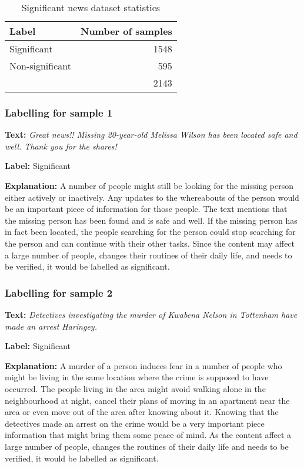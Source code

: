 \begin{table}[h]
\begin{center}
\caption{Significant news dataset statistics}
\label{tbl:dataset_statistics}
\begin{tabular}{lr}
\toprule 
Label&Number of samples\\
\midrule 
Significant&1548\\
Non-significant&595\\
\bottomrule
&2143 \\
\end{tabular}
\end{center}
\end{table}

\subsubsection{Labelling for sample 1}
\textbf{Text:}
\textit{Great news!! Missing 20-year-old Melissa Wilson has been located safe and well. Thank you for the shares!}\par
\textbf{Label:} Significant\par
\textbf{Explanation:} A number of people might still be looking for the missing person either actively or inactively. Any updates to the whereabouts of the person would be an important piece of information for those people. The text mentions that the missing person has been found and is safe and well. If the missing person has in fact been located, the people searching for the person could stop searching for the person and can continue with their other tasks. Since the content may affect a large number of people, changes their routines of their daily life, and needs to be verified, it would be labelled as significant.

\subsubsection{Labelling for sample 2}
\textbf{Text:}
\textit{Detectives investigating the murder of Kwabena Nelson in Tottenham have made an arrest Haringey.}\par
\textbf{Label:} Significant\par
\textbf{Explanation:} A murder of a person induces fear in a number of people who might be living in the same location where the crime is supposed to have occurred. The people living in the area might avoid walking alone in the neighbourhood at night, cancel their plans of moving in an apartment near the area or even move out of the area after knowing about it. Knowing that the detectives made an arrest on the crime would be a very important piece information that might bring them some peace of mind. As the content affect a large number of people, changes the routines of their daily life and needs to be verified, it would be labelled as significant.

